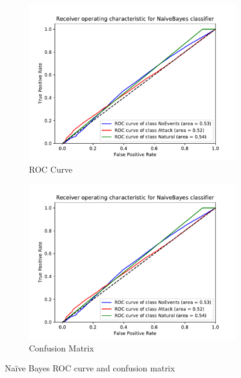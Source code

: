 \begin{figure}[H]
    \begin{subfigure}[t]{0.45\textwidth}
        \centering
        \includegraphics[page=1, width=\linewidth]{images/results_scikit/NaiveBayes}
        \caption{ROC Curve}
        \label{fig:scikit_NB_ROC}
    \end{subfigure}
    \begin{subfigure}[t]{0.45\textwidth}
        \centering
        \includegraphics[page=2, width=\linewidth, trim= 0 50 0 100, clip]{images/results_scikit/NaiveBayes}
        \caption{Confusion Matrix}
        \label{fig:scikit_NB_CM}
    \end{subfigure}
    \caption{Naïve Bayes ROC curve and confusion matrix}
    \label{fig:ROCCM_NB}
\end{figure}

